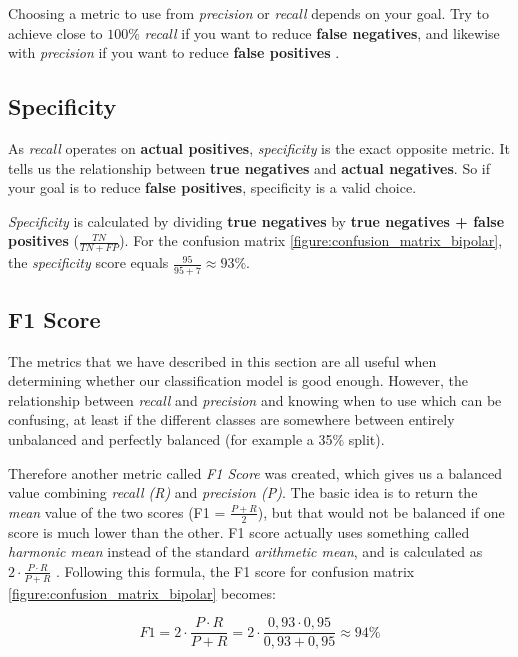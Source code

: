 Choosing a metric to use from \textit{precision} or \textit{recall} depends on your goal. Try to achieve close to $ 100\% $ \textit{recall} if you want to reduce \textbf{false negatives}, and likewise with \textit{precision} if you want to reduce \textbf{false positives} \cite{ml_metrics}.

\subsection{Specificity}

As \textit{recall} operates on \textbf{actual positives}, \textit{specificity} is the exact opposite metric. It tells us the relationship between \textbf{true negatives} and \textbf{actual negatives}. So if your goal is to reduce \textbf{false positives}, specificity is a valid choice.

\textit{Specificity} is calculated by dividing \textbf{true negatives} by \textbf{true negatives + false positives} ($ \frac{TN}{TN+FP} $). For the confusion matrix \ref{figure:confusion_matrix_bipolar}, the \textit{specificity} score equals $ \frac{95}{95+7} \approx 93\% $.

\subsection{F1 Score}

The metrics that we have described in this section are all useful when determining whether our classification model is good enough. However, the relationship between \textit{recall} and \textit{precision} and knowing when to use which can be confusing, at least if the different classes are somewhere between entirely unbalanced and perfectly balanced (for example a 35\% split). 

Therefore another metric called \textit{F1 Score} was created, which gives us a balanced value combining \textit{recall (R)} and \textit{precision (P)}. The basic idea is to return the \textit{mean} value of the two scores (F1 = $ \frac{P + R}{2} $), but that would not be balanced if one score is much lower than the other. F1 score actually uses something called \textit{harmonic mean} instead of the standard \textit{arithmetic mean}, and is calculated as $ 2 \cdot \frac{P \cdot R}{P + R} $ \cite{ml_metrics}. 
Following this formula, the F1 score for confusion matrix \ref{figure:confusion_matrix_bipolar} becomes:

\[
  F1 = 2 \cdot \frac{P \cdot R}{P + R} = 2 \cdot \frac{0,93 \cdot 0,95}{0,93 + 0,95} \approx 94\%
\]

